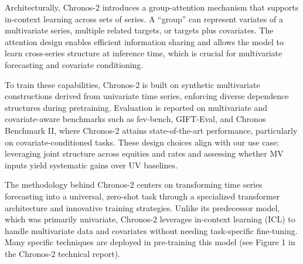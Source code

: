 \documentclass[twocolumn]{article}
\begin{document}
Architecturally, Chronos-2 introduces a group-attention mechanism that supports in-context learning across sets of series. A ``group'' can represent variates of a multivariate series, multiple related targets, or targets plus covariates. The attention design enables efficient information sharing and allows the model to learn cross-series structure at inference time, which is crucial for multivariate forecasting and covariate conditioning.

To train these capabilities, Chronos-2 is built on synthetic multivariate constructions derived from univariate time series, enforcing diverse dependence structures during pretraining. Evaluation is reported on multivariate and covariate-aware benchmarks such as fev-bench, GIFT-Eval, and Chronos Benchmark II, where Chronos-2 attains state-of-the-art performance, particularly on covariate-conditioned tasks. These design choices align with our use case: leveraging joint structure across equities and rates and assessing whether MV inputs yield systematic gains over UV baselines.

The methodology behind Chronos-2 centers on transforming time series forecasting into a universal, zero-shot task through a specialized transformer architecture and innovative training strategies. Unlike its predecessor model, which was primarily univariate, Chronos-2 leverages in-context learning (ICL) to handle multivariate data and covariates without needing task-specific fine-tuning. Many specific techniques are deployed in pre-training this model (see Figure 1 in the Chronos-2 technical report). 
\end{document}
